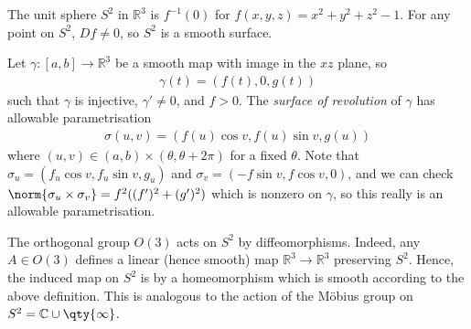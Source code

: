 \begin{example}
	The unit sphere $S^2$ in $\mathbb R^3$ is $f^{-1}(0)$ for $f(x,y,z) = x^2 + y^2 + z^2 - 1$.
	For any point on $S^2$, $Df \neq 0$, so $S^2$ is a smooth surface.
\end{example}
\begin{example}
	Let $\gamma \colon [a,b] \to \mathbb R^3$ be a smooth map with image in the $xz$ plane, so
	\begin{align*}
		\gamma(t) = (f(t), 0, g(t))
	\end{align*}
	such that $\gamma$ is injective, $\gamma' \neq 0$, and $f > 0$.
	The \textit{surface of revolution} of $\gamma$ has allowable parametrisation
	\begin{align*}
		\sigma(u,v) = (f(u)\cos v, f(u)\sin v, g(u))
	\end{align*}
	where $(u,v) \in (a,b) \times (\theta, \theta + 2\pi)$ for a fixed $\theta$.
	Note that $\sigma_u = (f_u \cos v, f_u \sin v, g_u)$ and $\sigma_v = (-f\sin v, f \cos v, 0)$, and we can check $\norm{\sigma_u \times \sigma_v} = f^2 ((f')^2 + (g')^2)$ which is nonzero on $\gamma$, so this really is an allowable parametrisation.
\end{example}
\begin{example}
	The orthogonal group $O(3)$ acts on $S^2$ by diffeomorphisms.
	Indeed, any $A \in O(3)$ defines a linear (hence smooth) map $\mathbb R^3 \to \mathbb R^3$ preserving $S^2$.
	Hence, the induced map on $S^2$ is by a homeomorphism which is smooth according to the above definition.
	This is analogous to the action of the M\"obius group on $S^2 = \mathbb C \cup \qty{\infty}$.
\end{example}

